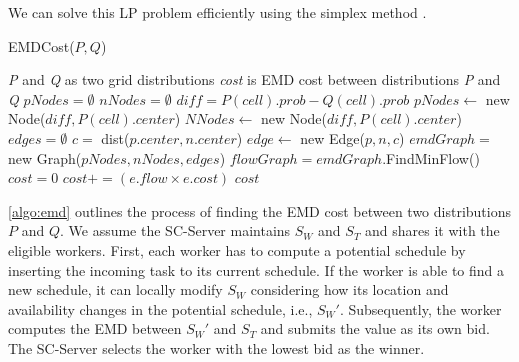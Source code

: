 \noindent We can solve this LP problem efficiently using the simplex method \cite{Dantzig90}.\\

\begin{algorithm}[h]
\caption{EMDCost($P, Q$)}
\label{algo:emd}
\begin{algorithmic}[1]
\REQUIRE \emph{P} and \emph{Q} as two grid distributions
\ENSURE \emph{cost} is EMD cost between distributions \emph{P} and \emph{Q}
\STATE $pNodes = \emptyset$
\STATE $nNodes = \emptyset$
	\STATE $diff = P(cell).prob - Q(cell).prob$
		\STATE $pNodes \leftarrow$ new Node($diff, P(cell).center$)
	\ELSE
		\STATE $NNodes \leftarrow$ new Node($diff, P(cell).center$)
	\ENDIF
\ENDFOR
\STATE $edges = \emptyset$
		\STATE $c =$ dist($p.center, n.center$)
		\STATE $edge \leftarrow$ new Edge($p, n, c$)
	\ENDFOR
\ENDFOR
\STATE $emdGraph =$ new Graph($pNodes, nNodes, edges$)
\STATE $flowGraph = emdGraph$.FindMinFlow()
\STATE $cost = 0$
	\STATE $cost += (e.flow \times e.cost)$
\ENDFOR
\RETURN $cost$
\end{algorithmic}
\end{algorithm}

\cref{algo:emd} outlines the process of finding the EMD cost between two distributions $P$ and $Q$. We assume the SC-Server maintains $S_W$ and $S_T$ and shares it with the eligible workers. First, each worker has to compute a potential schedule by inserting the incoming task to its current schedule. If the worker is able to find a new schedule, it can locally modify $S_W$ considering how its location and availability changes in the potential schedule, i.e., $S_{W}'$. Subsequently, the worker computes the EMD between $S_{W}'$ and $S_T$ and submits the value as its own bid. The SC-Server selects the worker with the lowest bid as the winner.



